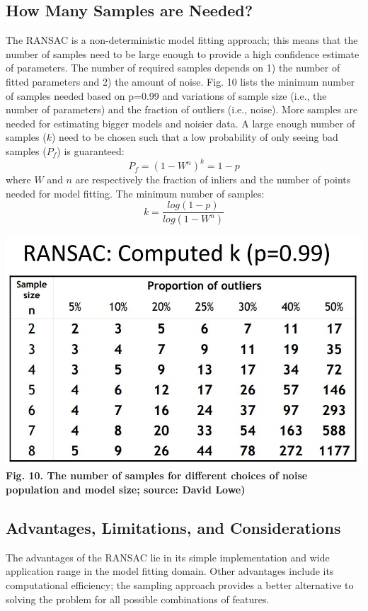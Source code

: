\documentclass{article}
\begin{document}
\subsection{How Many Samples are Needed?}
The RANSAC is a non-deterministic model fitting approach; this means that the number of samples need to be large enough to provide a high confidence estimate of parameters. The number of required samples depends on 1) the number of fitted parameters and 2) the amount of noise. Fig. 10 lists the minimum number of samples needed based on p=0.99 and variations of sample size (i.e., the number of parameters) and the fraction of outliers (i.e., noise). More samples are needed for estimating bigger models and noisier data.
A large enough number of samples ($k$) need to be chosen such that a low probability of only seeing bad samples (${P_f}$) is guaranteed:
$${P_f}= (1-W^n)^k= 1-p$$
where $W$ and $n$ are respectively the fraction of inliers and the number of points needed for model fitting. The minimum number of samples:
$$k=\frac{log(1-p)}{log(1-W^n)}$$

\includegraphics[width=\textwidth]{ransac4.png}
\textbf{Fig. 10. The number of samples for different choices of noise population and model size; source: David Lowe)}

\subsection{Advantages, Limitations, and Considerations}
The advantages of the RANSAC lie in its simple implementation and wide application range in the model fitting domain. Other advantages include its computational efficiency; the sampling approach provides a better alternative to solving the problem for all possible combinations of features.
\end{document}
